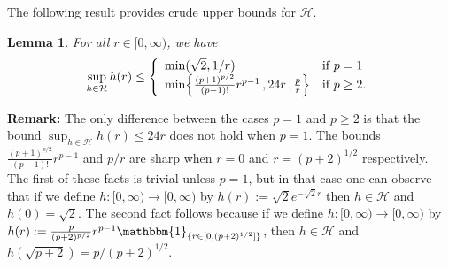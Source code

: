 \documentclass[12pt]{article}
\newtheorem{lemma}[theorem]{Lemma}
\begin{document}
The following result provides crude upper bounds for $\mathcal{H}$.
\begin{lemma}
\label{Lemma:Crude}
For all $r \in [0,\infty)$, we have
\begin{equation}
\label{Eq:ThreeBounds}
\sup_{h \in \mathcal{H}} h(r) \leq \left\{ \begin{array}{ll} \min(\sqrt{2},1/r) & \mbox{if $p=1$} \\
\min\Bigl\{\frac{(p+1)^{p/2}}{(p-1)!}r^{p-1} \, , 24r \, , \frac{p}{r}\Bigr\} & \mbox{if $p \geq 2$.} \end{array} \right.
\end{equation}
\end{lemma}
\textbf{Remark:} The only difference between the cases $p=1$ and $p \geq 2$ is that the bound $\sup_{h \in \mathcal{H}} h(r) \leq 24r$ does not hold when $p=1$.  The bounds $\frac{(p+1)^{p/2}}{(p-1)!}r^{p-1}$ and $p/r$ are sharp when $r=0$ and $r = (p+2)^{1/2}$ respectively.  The first of these facts is trivial unless $p=1$, but in that case one can observe that if we define $h:[0,\infty) \rightarrow [0,\infty)$ by $h(r) := \sqrt{2}e^{-\sqrt{2}r}$ then $h \in \mathcal{H}$ and $h(0) = \sqrt{2}$.  The second fact follows because if we define $h:[0,\infty) \rightarrow [0,\infty)$ by $h(r) := \frac{p}{(p+2)^{p/2}}r^{p-1}\mathbbm{1}_{\{r \in [0,(p+2)^{1/2}]\}}$, then $h \in \mathcal{H}$ and $h(\sqrt{p+2}) = p/(p+2)^{1/2}$.
\end{document}
